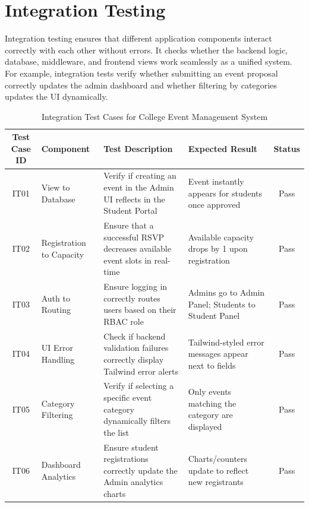 \newpage
\section{Integration Testing}
Integration testing ensures that different application components interact correctly with each other without errors. It checks whether the backend logic, database, middleware, and frontend views work seamlessly as a unified system. For example, integration tests verify whether submitting an event proposal correctly updates the admin dashboard and whether filtering by categories updates the UI dynamically. 
\FloatBarrier %
\vspace{-10pt} %
\begin{table}[H]
    \centering
    \renewcommand{\arraystretch}{1.3}
    \small
    \begin{tabular}{|c|p{3cm}|p{3cm}|p{3cm}|c|}
        \hline
        \textbf{Test Case ID} & \textbf{Component} & \textbf{Test Description} & \textbf{Expected Result} & \textbf{Status} \\
        \hline
        IT01 & View to Database & Verify if creating an event in the Admin UI reflects in the Student Portal & Event instantly appears for students once approved & Pass \\
        \hline
        IT02 & Registration to Capacity & Ensure that a successful RSVP decreases available event slots in real-time & Available capacity drops by 1 upon registration & Pass \\
        \hline
        IT03 & Auth to Routing & Ensure logging in correctly routes users based on their RBAC role & Admins go to Admin Panel; Students to Student Panel & Pass \\
        \hline
        IT04 & UI Error Handling & Check if backend validation failures correctly display Tailwind error alerts & Tailwind-styled error messages appear next to fields & Pass \\
        \hline
        IT05 & Category Filtering & Verify if selecting a specific event category dynamically filters the list & Only events matching the category are displayed & Pass \\
        \hline
        IT06 & Dashboard Analytics & Ensure student registrations correctly update the Admin analytics charts & Charts/counters update to reflect new registrants & Pass \\
        \hline
    \end{tabular}
    \caption{Integration Test Cases for College Event Management System}
    \label{tab:integration_tests}
\end{table}

